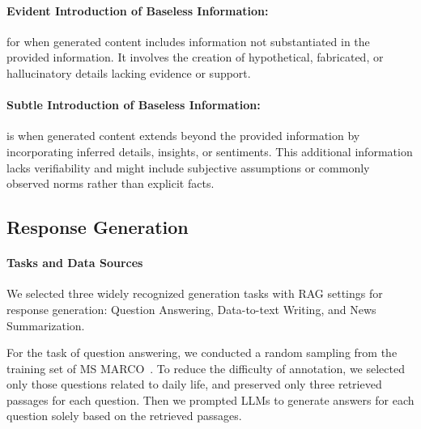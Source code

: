 \documentclass[11pt]{article}
\begin{document}
\paragraph{Evident Introduction of Baseless Information:} for when generated content includes information not substantiated in the provided information. It involves the creation of hypothetical, fabricated, or hallucinatory details lacking evidence or support. 

\paragraph{Subtle Introduction of Baseless Information:} is when generated content extends beyond the provided information by incorporating inferred details, insights, or sentiments. This additional information lacks verifiability and might include subjective assumptions or commonly observed norms rather than explicit facts. 

\subsection{Response Generation}

\paragraph{Tasks and Data Sources} 
We selected three widely recognized generation tasks with RAG settings for response generation: Question Answering, Data-to-text Writing, and News Summarization.

For the task of question answering, we conducted a random sampling from the training set of MS MARCO~\cite{DBLP:journals/corr/NguyenRSGTMD16}. 
To reduce the difficulty of annotation, we selected only those questions related to daily life, and preserved only three retrieved passages for each question.
Then we prompted LLMs to generate answers for each question solely based on the retrieved passages.
\end{document}
